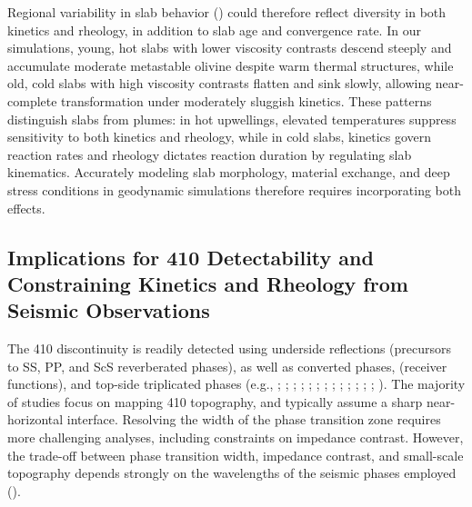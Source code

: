 \documentclass[
  paper=a4,
  ,captions=tableheading
]{scrartcl}
\begin{document}
Regional variability in slab behavior () could therefore reflect diversity in both kinetics and
rheology, in addition to slab age and convergence rate. In our
simulations, young, hot slabs with lower viscosity contrasts descend
steeply and accumulate moderate metastable olivine despite warm thermal
structures, while old, cold slabs with high viscosity contrasts flatten
and sink slowly, allowing near-complete transformation under moderately
sluggish kinetics. These patterns distinguish slabs from plumes: in hot
upwellings, elevated temperatures suppress sensitivity to both kinetics
and rheology, while in cold slabs, kinetics govern reaction rates and
rheology dictates reaction duration by regulating slab kinematics.
Accurately modeling slab morphology, material exchange, and deep stress
conditions in geodynamic simulations therefore requires incorporating
both effects.

\subsection{Implications for 410 Detectability and Constraining Kinetics
and Rheology from Seismic Observations}\label{sec:410-detectability}

The 410 discontinuity is readily detected using underside reflections
(precursors to SS, PP, and ScS reverberated phases), as well as
converted phases, (receiver functions), and top-side triplicated phases
(e.g., ;
;
;
;
;
;
;
;
;
;
;
; ; ). The
majority of studies focus on mapping 410 topography, and typically
assume a sharp near-horizontal interface. Resolving the width of the
phase transition zone requires more challenging analyses, including
constraints on impedance contrast. However, the trade-off between phase
transition width, impedance contrast, and small-scale topography depends
strongly on the wavelengths of the seismic phases employed
().
\end{document}
